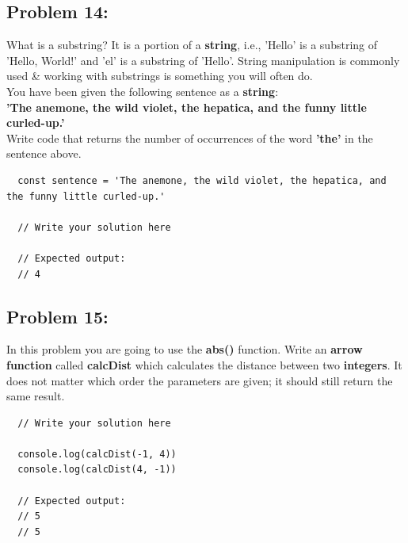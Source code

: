 \documentclass{article}
\begin{document}
\subsection*{Problem 14:}
What is a substring? It is a portion of a \textbf{string}, i.e., 'Hello' is a substring of 'Hello, World!' and 'el' is a substring of 'Hello'. String manipulation is commonly used \& working with substrings is something you will often do. \\

You have been given the following sentence as a \textbf{string}: \\

\textbf{'The anemone, the wild violet, the hepatica, and the funny little curled-up.'} \\

Write code that returns the number of occurrences of the word \textbf{'the'} in the sentence above.

\begin{verbatim}
  const sentence = 'The anemone, the wild violet, the hepatica, and the funny little curled-up.'

  // Write your solution here

  // Expected output:
  // 4
\end{verbatim}

\subsection*{Problem 15:}
In this problem you are going to use the \textbf{abs()} function. Write an \textbf{arrow function} called \textbf{calcDist} which calculates the distance between two \textbf{integers}. It does not matter which order the parameters are given; it should still return the same result. 

\begin{verbatim}
  // Write your solution here

  console.log(calcDist(-1, 4))
  console.log(calcDist(4, -1))

  // Expected output:
  // 5
  // 5
\end{verbatim}
\end{document}
